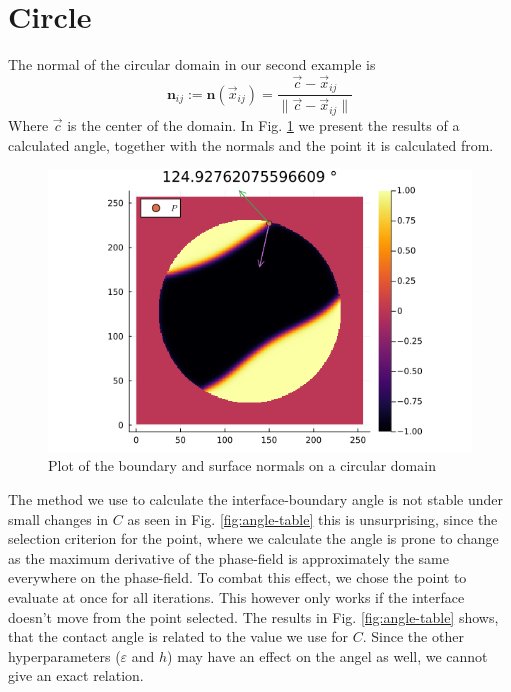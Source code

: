 \documentclass{mimosis}
\begin{document}
\section{Circle}
\label{sec:org9915123}
The normal of the circular domain in our second example is
\begin{equation}
\label{eq:3}
\mathbf{n}_{ij} := \mathbf{n}(\vec{x}_{ij}) = \frac{\vec{c} - \vec{x}_{ij}}{\| \vec{c} - \vec{x}_{ij}\|}
\end{equation}
Where \(\vec{c}\) is the center of the domain.
In Fig. \ref{fig:angle-on-circle} we present the results of a calculated angle, together with the normals and the point it is calculated from.
\begin{figure}[htbp]
\centering
\includegraphics[width=.9\linewidth]{images/angle-circle.png}
\caption{\label{fig:angle-on-circle}Plot of the boundary and surface normals on a circular domain}
\end{figure}


The method we use to calculate the interface-boundary angle is not stable under small changes in \(C\) as seen in  Fig. \ref{fig:angle-table} this is unsurprising, since the selection criterion for the point, where we calculate the angle is prone to change as the maximum derivative of the phase-field is approximately the same everywhere on the phase-field. To combat this effect, we chose the point to evaluate at once for all iterations. This however only works if the interface doesn't move from the point selected. The results in Fig. \ref{fig:angle-table} shows, that the contact angle is related to the value we use for \(C\). Since the other hyperparameters (\(\varepsilon\) and \(h\)) may have an effect on the angel as well, we cannot give an exact relation.
\end{document}

